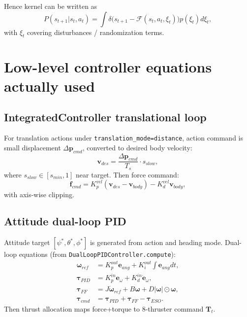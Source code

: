 \documentclass[11pt]{article}
\begin{document}
Hence kernel can be written as
\begin{equation}
P(s_{t+1}|s_t,a_t)=\int\delta\big(s_{t+1}-\mathcal{F}(s_t,a_t,\xi_t)\big)p(\xi_t)d\xi_t,
\end{equation}
with \(\xi_t\) covering disturbances / randomization terms.

\section{Low-level controller equations actually used}

\subsection{IntegratedController translational loop}
For translation actions under \texttt{translation\_mode=distance}, action command is small displacement \(\Delta \bm{p}_{cmd}\), converted to desired body velocity:
\begin{equation}
\bm{v}_{des} = \frac{\Delta \bm{p}_{cmd}}{T_s}\cdot s_{slow},
\end{equation}
where \(s_{slow}\in[s_{min},1]\) near target.
Then force command:
\begin{equation}
\bm{f}_{cmd} = K_p^{vel}(\bm{v}_{des}-\bm{v}_{body}) - K_d^{vel}\bm{v}_{body},
\end{equation}
with axis-wise clipping.

\subsection{Attitude dual-loop PID}
Attitude target \([\psi^*,\theta^*,\phi^*]\) is generated from action and heading mode.
Dual-loop equations (from \texttt{DualLoopPIDController.compute}):
\begin{align}
\bm{\omega}_{ref} &= K_p^{out}\bm{e}_{ang}+K_i^{out}\!\int\!\bm{e}_{ang}dt,\\
\bm{\tau}_{PID} &= K_p^{in}\bm{e}_{\omega}+K_d^{in}\dot{\bm{e}}_{\omega},\\
\bm{\tau}_{FF} &= J\dot{\bm{\omega}}_{ref}+B\bm{\omega}+D|\bm{\omega}|\odot\bm{\omega},\\
\bm{\tau}_{cmd} &= \bm{\tau}_{PID}+\bm{\tau}_{FF}-\bm{\tau}_{ESO}.
\end{align}
Then thrust allocation maps force+torque to 8-thruster command \(\bm{T}_t\).
\end{document}
